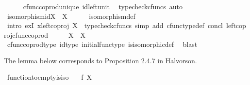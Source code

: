 \begin{isabellebody}
\ \ \ \ \isamarkupfalse%
\ cfunc{\isacharunderscore}{\kern0pt}coprod{\isacharunderscore}{\kern0pt}unique\ id{\isacharunderscore}{\kern0pt}left{\isacharunderscore}{\kern0pt}unit{}\ \isamarkupfalse%
\ {\isacharparenleft}{\kern0pt}typecheck{\isacharunderscore}{\kern0pt}cfuncs{\isacharcomma}{\kern0pt}\ auto{\isacharparenright}{\kern0pt}\isanewline
\ \ \isamarkupfalse%
\ \isamarkupfalse%
\ {\isachardoublequoteopen}isomorphism{\isacharparenleft}{\kern0pt}id{\isacharparenleft}{\kern0pt}X{\isacharparenright}{\kern0pt}\ {\isasymamalg}\ {\isasymalpha}\isactrlbsub X\isactrlesub {\isacharparenright}{\kern0pt}{\isachardoublequoteclose}\isanewline
\ \ \ \ \isamarkupfalse%
\ isomorphism{\isacharunderscore}{\kern0pt}def\ \isanewline
\ \ \ \ \isamarkupfalse%
\ {\isacharparenleft}{\kern0pt}intro\ exI{\isacharbrackleft}{\kern0pt}\ x{\isacharequal}{\kern0pt}{\isachardoublequoteopen}left{\isacharunderscore}{\kern0pt}coproj\ X\ {\isasymemptyset}{\isachardoublequoteclose}{\isacharbrackright}{\kern0pt}{\isacharcomma}{\kern0pt}\ typecheck{\isacharunderscore}{\kern0pt}cfuncs{\isacharcomma}{\kern0pt}\ simp\ add{\isacharcolon}{\kern0pt}\ cfunc{\isacharunderscore}{\kern0pt}type{\isacharunderscore}{\kern0pt}def\ concl\ left{\isacharunderscore}{\kern0pt}coproj{\isacharunderscore}{\kern0pt}cfunc{\isacharunderscore}{\kern0pt}coprod{\isacharparenright}{\kern0pt}\isanewline
\ \ \isamarkupfalse%
\ \isamarkupfalse%
\ {\isachardoublequoteopen}X{\isasymCoprod}{\isasymemptyset}\ {\isasymcong}\ X{\isachardoublequoteclose}\isanewline
\ \ \ \ \isamarkupfalse%
\ cfunc{\isacharunderscore}{\kern0pt}coprod{\isacharunderscore}{\kern0pt}type\ id{\isacharunderscore}{\kern0pt}type\ initial{\isacharunderscore}{\kern0pt}func{\isacharunderscore}{\kern0pt}type\ is{\isacharunderscore}{\kern0pt}isomorphic{\isacharunderscore}{\kern0pt}def\ \isamarkupfalse%
\ blast\isanewline
{}\isamarkupfalse%
%
\endisatagproof
{\isafoldproof}%
%
\isadelimproof
%
\endisadelimproof
%
\begin{isamarkuptext}%
The lemma below corresponds to Proposition 2.4.7 in Halvorson.%
\end{isamarkuptext}\isamarkuptrue%
\isamarkupfalse%
\ function{\isacharunderscore}{\kern0pt}to{\isacharunderscore}{\kern0pt}empty{\isacharunderscore}{\kern0pt}is{\isacharunderscore}{\kern0pt}iso{\isacharcolon}{\kern0pt}\isanewline
\ \ \ {\isachardoublequoteopen}f{\isacharcolon}{\kern0pt}\ X\ {\isasymrightarrow}\ {\isasymemptyset}{\isachardoublequoteclose}\isanewline

\end{isabellebody}
